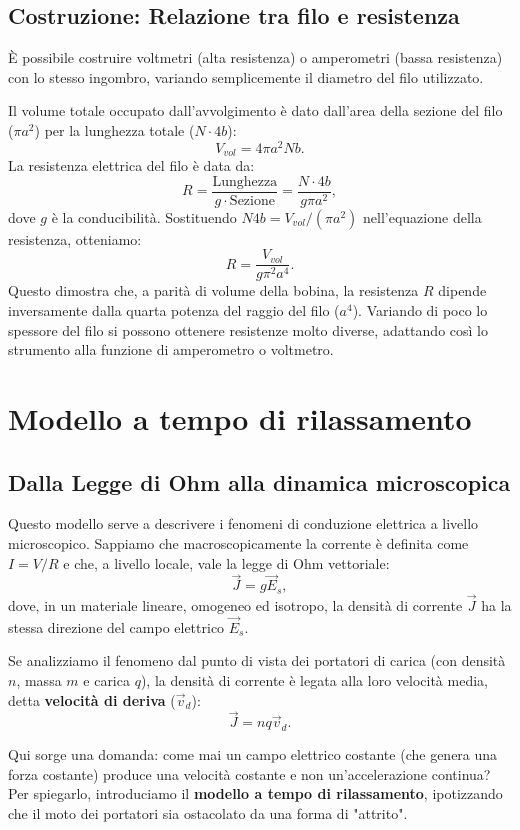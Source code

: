 \documentclass{book}
\begin{document}
\subsection*{Costruzione: Relazione tra filo e resistenza}
È possibile costruire voltmetri (alta resistenza) o amperometri (bassa resistenza) con lo stesso ingombro, variando semplicemente il diametro del filo utilizzato.

Il volume totale occupato dall'avvolgimento è dato dall'area della sezione del filo (\(\pi a^2\)) per la lunghezza totale (\(N \cdot 4b\)):
\[
V_{vol} = 4\pi a^2 N b.
\]
La resistenza elettrica del filo è data da:
\[
R = \frac{\text{Lunghezza}}{g \cdot \text{Sezione}} = \frac{N\cdot 4b}{g\pi a^2},
\]
dove \(g\) è la conducibilità. Sostituendo \(N4b = V_{vol}/(\pi a^2)\) nell'equazione della resistenza, otteniamo:
\[
R = \frac{V_{vol}}{g\pi^2 a^4}.
\]
Questo dimostra che, a parità di volume della bobina, la resistenza \(R\) dipende inversamente dalla quarta potenza del raggio del filo (\(a^4\)). Variando di poco lo spessore del filo si possono ottenere resistenze molto diverse, adattando così lo strumento alla funzione di amperometro o voltmetro.


\section{Modello a tempo di rilassamento}

\subsection*{Dalla Legge di Ohm alla dinamica microscopica}
Questo modello serve a descrivere i fenomeni di conduzione elettrica a livello microscopico.
Sappiamo che macroscopicamente la corrente è definita come \(I = V/R\) e che, a livello locale, vale la legge di Ohm vettoriale:
\[
\vec{J} = g\vec{E}_s,
\]
dove, in un materiale lineare, omogeneo ed isotropo, la densità di corrente \(\vec{J}\) ha la stessa direzione del campo elettrico \(\vec{E}_s\).

Se analizziamo il fenomeno dal punto di vista dei portatori di carica (con densità \(n\), massa \(m\) e carica \(q\)), la densità di corrente è legata alla loro velocità media, detta \textbf{velocità di deriva} (\(\vec{v}_d\)):
\[
\vec{J}= n q \vec{v}_d.
\]

Qui sorge una domanda: come mai un campo elettrico costante (che genera una forza costante) produce una velocità costante e non un'accelerazione continua? Per spiegarlo, introduciamo il \textbf{modello a tempo di rilassamento}, ipotizzando che il moto dei portatori sia ostacolato da una forma di "attrito".
\end{document}
